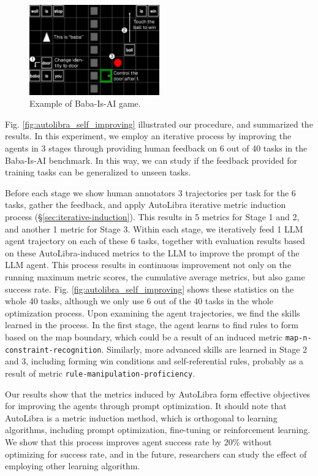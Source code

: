 \documentclass[../main.tex]{subfiles}
\begin{document}
\begin{figure}[!t]
\centering
\includegraphics[width=0.5\textwidth]{figs/babaisai-self-referential.pdf}
\caption{Example of Baba-Is-AI game.}
\label{fig:baba-is-ai}
\end{figure}


Fig. \ref{fig:autolibra_self_improving} illustrated our procedure, and
summarized the results. In this experiment, we employ an iterative process by
improving the agents in 3 stages through providing human feedback on 6 out of 40
tasks in the Baba-Is-AI \citep{paglieri2024balrog} benchmark. In this way, we can study
if the feedback provided for training tasks can be generalized to unseen tasks.

Before each stage we show human annotators 3 trajectories per task for the 6 tasks,
gather the feedback, and apply AutoLibra iterative metric induction process (\S\ref{sec:iterative-induction}).
This results in 5 metrics for Stage 1 and 2, and another 1 metric for Stage 3. Within
each stage, we iteratively feed 1 LLM agent trajectory on each of these 6 tasks,
together with evaluation results based on these AutoLibra-induced metrics to the
LLM to improve the prompt of the LLM agent. This process results in continuous
improvement not only on the running maximum metric scores, the cumulative average
metrics, but also game success rate. Fig. \ref{fig:autolibra_self_improving}
shows these statistics on the whole 40 tasks, although we only use 6 out of the 40
tasks in the whole optimization process. Upon examining the agent trajectories, we
find the skills learned in the process. In the first stage, the agent learns to find
rules to form based on the map boundary, which could be a result of an induced
metric \texttt{map-n-constraint-recognition}. Similarly, more advanced skills are
learned in Stage 2 and 3, including forming win conditions and self-referential
rules, probably as a result of metric \texttt{rule-manipulation-proficiency}.

Our results show that the metrics induced by AutoLibra form effective objectives
for improving the agents through prompt optimization. It should note that AutoLibra
is a metric induction method, which is orthogonal to learning algorithms, including
prompt optimization, fine-tuning or reinforcement learning. We show that this process
improves agent success rate by 20\% without optimizing for success rate, and in the
future, researchers can study the effect of employing other learning algorithm.
\end{document}
